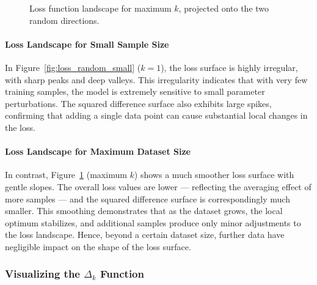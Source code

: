 \documentclass{article}
\begin{document}
\begin{figure}[!htbp]
  \hspace*{-2.2cm}
  \caption{Loss function landscape for maximum $k$, projected onto the two random directions.}
  \label{fig:loss_random_big}
\end{figure}

\paragraph{Loss Landscape for Small Sample Size}
In Figure~\ref{fig:loss_random_small} ($k=1$), the loss surface is highly irregular, with sharp peaks and deep valleys.
This irregularity indicates that with very few training samples, the model is extremely sensitive to small parameter perturbations.
The squared difference surface also exhibits large spikes, confirming that adding a single data point can cause substantial local changes
in the loss.

\paragraph{Loss Landscape for Maximum Dataset Size}
In contrast, Figure~\ref{fig:loss_random_big} (maximum $k$) shows a much smoother loss surface with gentle slopes. The overall loss
values are lower --- reflecting the averaging effect of more samples --- and the squared difference surface is correspondingly much smaller.
This smoothing demonstrates that as the dataset grows, the local optimum stabilizes, and additional samples produce only minor
adjustments to the loss landscape. Hence, beyond a certain dataset size, further data have negligible impact on the shape of the loss
surface.

\subsubsection{Visualizing the \texorpdfstring{$\Delta_k$}{Delta k} Function}
\end{document}
